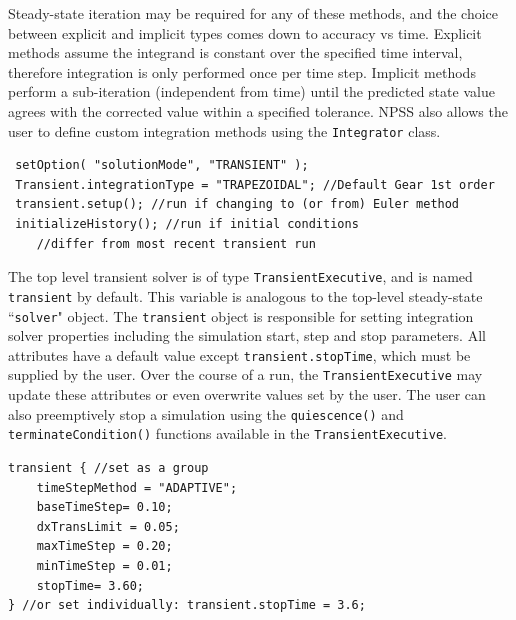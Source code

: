 \documentclass[heading.tex]{subfiles}
\begin{document}
\vspace{5mm} %

Steady-state iteration may be required for any of these methods, and the choice between explicit
and implicit types comes down to accuracy vs time. Explicit methods assume the integrand is
constant over the specified time interval, therefore integration is only performed once per time
step. Implicit methods perform a sub-iteration (independent from time) until the predicted state
value agrees with the corrected value within a specified tolerance. NPSS also allows the user to
define custom integration methods using the \texttt{Integrator} class. \cite[chap.~15.2]{NPSS}  

\begin{adjustwidth}{-0.5cm}{-0.5cm}
 \begin{verbatim}
 setOption( "solutionMode", "TRANSIENT" );
 Transient.integrationType = "TRAPEZOIDAL"; //Default Gear 1st order
 transient.setup(); //run if changing to (or from) Euler method
 initializeHistory(); //run if initial conditions 
 	//differ from most recent transient run
 \end{verbatim}
 \end{adjustwidth} 
       

The top level transient solver is of type \texttt{TransientExecutive}, and is named
\texttt{transient} by default. This variable is analogous to the top-level steady-state 
``\texttt{solver}" object. The \texttt{transient} object is responsible for setting integration
solver properties including the simulation start, step and stop parameters. \cite[chap.~7.5]{NPSS}
\cite[chap.~15.1.8]{NPSS}  All attributes have a default value except \texttt{transient.stopTime},
which must be supplied by the user. Over the course of a run, the \texttt{TransientExecutive} may
update these attributes or even overwrite values set by the user. The user can also preemptively
stop a simulation using the  \texttt{quiescence()} and  \texttt{terminateCondition()} functions
available in the \texttt{TransientExecutive}.

\begin{adjustwidth}{0cm}{0cm}
 \begin{verbatim}
transient { //set as a group
	timeStepMethod = "ADAPTIVE";
	baseTimeStep= 0.10;
	dxTransLimit = 0.05;
	maxTimeStep = 0.20;
	minTimeStep = 0.01;
	stopTime= 3.60;
} //or set individually: transient.stopTime = 3.6;
 \end{verbatim}
 \end{adjustwidth} 
\end{document}
